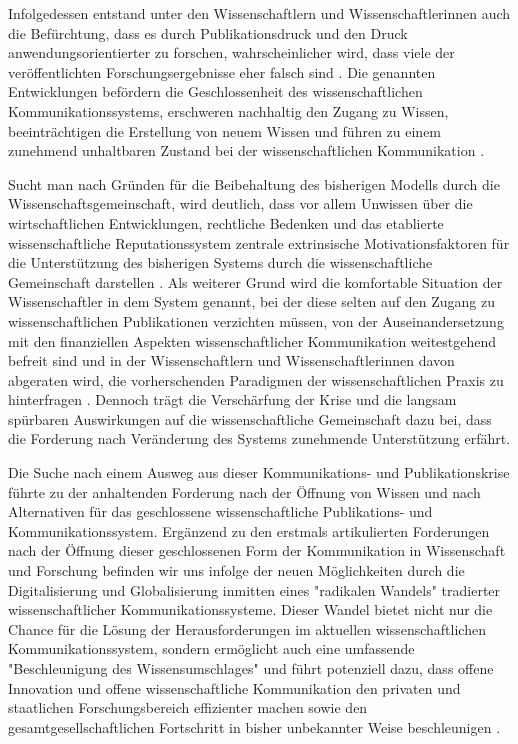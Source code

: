 Infolgedessen entstand unter den Wissenschaftlern und Wissenschaftlerinnen auch die Befürchtung, dass es durch Publikationsdruck und den Druck anwendungsorientierter zu forschen, wahrscheinlicher wird, dass viele der veröffentlichten Forschungsergebnisse eher falsch sind \cite{Ioannidis_2005}. Die genannten Entwicklungen befördern die Geschlossenheit des wissenschaftlichen Kommunikationssystems, erschweren nachhaltig den Zugang zu Wissen, beeinträchtigen die Erstellung von neuem Wissen \cite{Willinsky_2006} \cite{Feyerabend_1986} \cite{Luhmann_1998} und führen zu einem zunehmend unhaltbaren Zustand bei der wissenschaftlichen Kommunikation \cite{Schekman_2013}.

Sucht man nach Gründen für die Beibehaltung des bisherigen Modells durch die Wissenschaftsgemeinschaft, wird deutlich, dass vor allem Unwissen über die wirtschaftlichen Entwicklungen, rechtliche Bedenken und das etablierte wissenschaftliche Reputationssystem zentrale extrinsische Motivationsfaktoren für die Unterstützung des bisherigen Systems durch die wissenschaftliche Gemeinschaft darstellen \cite{Herb_2015}. Als weiterer Grund wird die komfortable Situation der Wissenschaftler in dem System genannt, bei der diese selten auf den Zugang zu wissenschaftlichen Publikationen verzichten müssen, von der Auseinandersetzung mit den finanziellen Aspekten wissenschaftlicher Kommunikation weitestgehend befreit sind \cite{Sietmann_2007} \cite{Hanekop_2006} und in der Wissenschaftlern und Wissenschaftlerinnen davon abgeraten wird, die vorherschenden Paradigmen der wissenschaftlichen Praxis zu hinterfragen \cite{Siegfried_2013} \cite{Loeb_2013}. Dennoch trägt die Verschärfung der Krise und die langsam spürbaren Auswirkungen auf die wissenschaftliche Gemeinschaft dazu bei, dass die Forderung nach Veränderung des Systems zunehmende Unterstützung erfährt.

Die Suche nach einem Ausweg aus dieser Kommunikations- und Publikationskrise führte zu der anhaltenden Forderung nach der Öffnung von Wissen und nach Alternativen für das geschlossene wissenschaftliche Publikations- und Kommunikationssystem. Ergänzend zu den erstmals artikulierten Forderungen nach der Öffnung dieser geschlossenen Form der Kommunikation in Wissenschaft und Forschung befinden wir uns infolge der neuen Möglichkeiten durch die Digitalisierung und Globalisierung inmitten eines "radikalen Wandels" \cite{Poynder_2011} tradierter wissenschaftlicher Kommunikationssysteme. Dieser Wandel bietet nicht nur die Chance für die Lösung der Herausforderungen im aktuellen wissenschaftlichen Kommunikationssystem, sondern ermöglicht auch eine umfassende "Beschleunigung des Wissensumschlages" \cite[:540]{Giesecke_1991} und führt potenziell dazu, dass offene Innovation und offene wissenschaftliche Kommunikation den privaten und staatlichen Forschungsbereich effizienter machen \cite{Chesbrough_2006} sowie den gesamtgesellschaftlichen Fortschritt in bisher unbekannter Weise beschleunigen \cite{Chesbrough_2003}.

